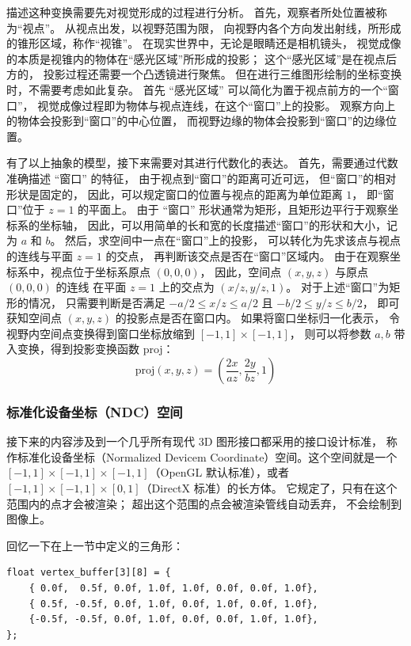 \documentclass[fontset=windows]{ctexart}
\begin{document}
描述这种变换需要先对视觉形成的过程进行分析。
首先，观察者所处位置被称为“视点”。
从视点出发，以视野范围为限，
向视野内各个方向发出射线，所形成的锥形区域，称作“视锥”。
在现实世界中，无论是眼睛还是相机镜头，
视觉成像的本质是视锥内的物体在“感光区域”所形成的投影；
这个“感光区域”是在视点后方的，
投影过程还需要一个凸透镜进行聚焦。
但在进行三维图形绘制的坐标变换时，不需要考虑如此复杂。
首先 “感光区域” 可以简化为置于视点前方的一个“窗口”，
视觉成像过程即为物体与视点连线，在这个“窗口”上的投影。
观察方向上的物体会投影到“窗口”的中心位置，
而视野边缘的物体会投影到“窗口”的边缘位置。

有了以上抽象的模型，接下来需要对其进行代数化的表达。
首先，需要通过代数准确描述 “窗口” 的特征，
由于视点到“窗口”的距离可近可远，
但“窗口”的相对形状是固定的，
因此，可以规定窗口的位置与视点的距离为单位距离 $1$，
即“窗口”位于 $z=1$ 的平面上。
由于 “窗口” 形状通常为矩形，且矩形边平行于观察坐标系的坐标轴，
因此，可以用简单的长和宽的长度描述“窗口”的形状和大小，记为 $a$ 和 $b$。
然后，求空间中一点在“窗口”上的投影，
可以转化为先求该点与视点的连线与平面 $z=1$ 的交点，
再判断该交点是否在“窗口”区域内。
由于在观察坐标系中，视点位于坐标系原点 $(0, 0, 0)$，
因此，空间点 $(x, y, z)$ 与原点 $(0, 0, 0)$ 的连线
在平面 $z=1$ 上的交点为 $(x/z, y/z, 1)$。
对于上述“窗口”为矩形的情况，
只需要判断是否满足
$-a/2 \le x/z \le a/2$
且 $-b/2 \le y/z \le b/2$，
即可获知空间点 $(x, y, z)$ 的投影点是否在窗口内。
如果将窗口坐标归一化表示，
令视野内空间点变换得到窗口坐标放缩到 $[-1, 1]\times[-1, 1]$，
则可以将参数 $a, b$ 带入变换，得到投影变换函数 proj：
$$\text{proj}\left(x, y, z\right) = (\frac{2x}{az}, \frac{2y}{bz}, 1)$$


\subsubsection{标准化设备坐标（NDC）空间}

接下来的内容涉及到一个几乎所有现代 3D 图形接口都采用的接口设计标准，
称作标准化设备坐标（Normalized Devicem Coordinate）空间。这个空间就是一个
$[-1, 1]\times [-1, 1] \times [-1, 1]$（OpenGL 默认标准），或者 $[-1, 1]\times [-1, 1] \times [0, 1]$（DirectX 标准）的长方体。
它规定了，只有在这个范围内的点才会被渲染；
超出这个范围的点会被渲染管线自动丢弃，
不会绘制到图像上。

回忆一下在上一节中定义的三角形：

\begin{lstlisting}
float vertex_buffer[3][8] = {
    { 0.0f,  0.5f, 0.0f, 1.0f, 1.0f, 0.0f, 0.0f, 1.0f},
    { 0.5f, -0.5f, 0.0f, 1.0f, 0.0f, 1.0f, 0.0f, 1.0f},
    {-0.5f, -0.5f, 0.0f, 1.0f, 0.0f, 0.0f, 1.0f, 1.0f},
};
\end{lstlisting}
\end{document}

